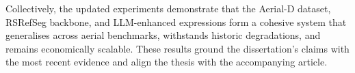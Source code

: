 Collectively, the updated experiments demonstrate that the Aerial-D dataset, RSRefSeg backbone, and LLM-enhanced expressions form a cohesive system that generalises across aerial benchmarks, withstands historic degradations, and remains economically scalable. These results ground the dissertation's claims with the most recent evidence and align the thesis with the accompanying article.
